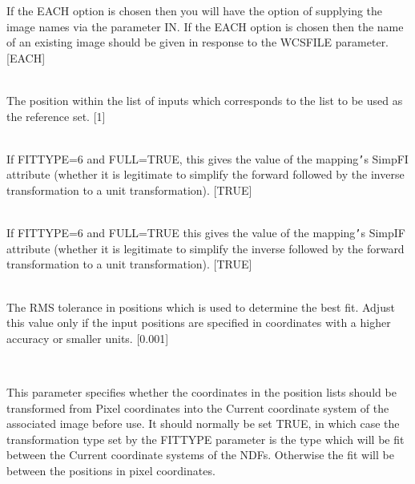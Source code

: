 \documentclass[twoside,11pt]{article}
\renewcommand{\_}{\texttt{\symbol{95}}}
\newcommand{\sstsubsection}[1]{ \item[{#1}] \mbox{} \\}
\newcommand{\sstsubsection}[1]{\item[{#1}]}
\begin{document}
{{{{         }
         If the EACH option is chosen then you will have the option of
         supplying the image names via the parameter IN. If the EACH
         option is chosen then the name of an existing image should be
         given in response to the WCSFILE parameter.
         [EACH]
      }
      \sstsubsection{
         REFPOS = \_INTEGER (Read)
      } {
         The position within the list of inputs which corresponds to
         the list to be used as the reference set.
         [1]
      }
      \sstsubsection{
         SIMPFI = \_LOGICAL (Read)
      }{
         If FITTYPE=6 and FULL=TRUE, this gives the value of the
         mapping{\tt '}s SimpFI attribute (whether it is legitimate to simplify
         the forward followed by the inverse transformation to a unit
         transformation).
         [TRUE]
      }
      \sstsubsection{
         SIMPIF = \_LOGICAL (Read)
      }{
         If FITTYPE=6 and FULL=TRUE this gives the value of the
         mapping{\tt '}s SimpIF attribute (whether it is legitimate to simplify
         the inverse followed by the forward transformation to a unit
         transformation).
         [TRUE]
      }
      \sstsubsection{
         TOLER = \_DOUBLE (Read)
      } {
        The RMS tolerance in positions which is used to determine the
        best fit. Adjust this value only if the input positions are
        specified in coordinates with a higher accuracy or smaller
        units.
        [0.001]
      }
      \sstsubsection{
         USEWCS = \_LOGICAL (Read)
      } {
         This parameter specifies whether the coordinates in the
         position lists should be transformed from Pixel coordinates
         into the Current coordinate system of the associated image
         before use.  It should normally be set TRUE, in which case
         the transformation type set by the FITTYPE parameter is the
         type which will be fit between the Current coordinate systems
         of the NDFs.  Otherwise the fit will be between the positions
         in pixel coordinates.

}}}
\end{document}
